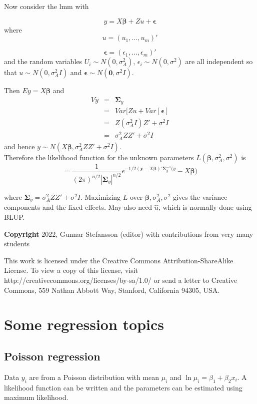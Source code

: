 \documentclass[12pt,a4paper]{article}
\theoremstyle{regla}
\theoremstyle{remark}
\theoremstyle{definition}
\theoremstyle{nonumberbreak}
\begin{document}
Now consider the lmm with 

$$y = X \boldsymbol{\beta} + Zu + \boldsymbol{\epsilon}$$
where
 $$u = (u_1 , \ldots , u_m)' $$

 
 $$\boldsymbol{\epsilon} = (\epsilon_1 , \ldots , \epsilon_m)'$$
and the random variables  $U_i \sim N(0, \sigma^2_A)$, $\epsilon_i \sim N(0, \sigma^2)$ are all independent so that $u \sim N(0, \sigma^2_A I)$ and $\boldsymbol{\epsilon} \sim N(\mathbf{0}, \sigma^2 I)$.

Then $Ey = X\boldsymbol{\beta}$ and 
\begin{eqnarray*}
Vy& = & \boldsymbol{\Sigma}_y \\
& = & Var[Zu+Var[\boldsymbol{\epsilon}] \\
& = & Z(\sigma^2_A I) Z' + \sigma^2 I\\
& = & \sigma^2_A Z Z' + \sigma^2 I
\end{eqnarray*}
and hence $y \sim N(X\boldsymbol{\beta},\sigma^2_A Z Z' + \sigma^2 I )$.\\

Therefore the likelihood function for the unknown parameters $L(\boldsymbol{\beta},\sigma^2_A, \sigma^2)$ is
$$ = \frac{1}{(2\pi)^{n/2} \left| \boldsymbol{\Sigma}_y \right| ^{n/2}} e^{-1/2 (\mathbf{y}-X\boldsymbol{\beta})' \boldsymbol{\Sigma}^{-1}_y (y}-X\boldsymbol{\beta})$$

where $\boldsymbol{\Sigma}_y =  \sigma^2_A Z Z' + \sigma^2 I$. Maximizing $L$ over $\boldsymbol{\beta},\sigma^2_A, \sigma^2$ gives the variance components and the fixed effects. May also need $\hat{u}$, which is normally done using BLUP.


{\bf Copyright}
2022, Gunnar Stefansson (editor) with contributions from very many students

This work is licensed under the Creative Commons
Attribution-ShareAlike License. To view a copy of this license, visit
http://creativecommons.org/licenses/by-sa/1.0/ or send a letter to
Creative Commons, 559 Nathan Abbott Way, Stanford, California 94305,
USA.
\clearpage
\section{Some regression topics}
\subsection{Poisson regression}
\begin{fbox}
\begin{minipage}{0.97\textwidth}
Data $y_i$ are from a Poisson distribution with mean $\mu_i$ and $\ln{\mu_i}=\beta_1+\beta_2 x_i$. A likelihood function can be written and the parameters can be estimated using maximum likelihood.



\end{minipage}
\end{fbox}
\end{document}
